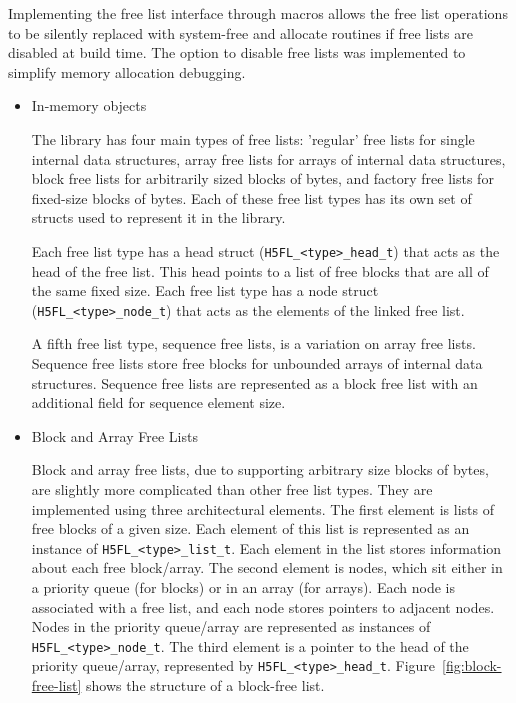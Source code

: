 Implementing the free list interface through macros allows the free list operations to be silently replaced with system-free and allocate routines if free lists are disabled at build time. The option to disable free lists was implemented to simplify memory allocation debugging.

\begin{itemize}

\item In-memory objects

The library has four main types of free lists: 'regular' free lists for single internal data structures, array free lists for arrays of internal data structures, block free lists for arbitrarily sized blocks of bytes, and factory free lists for fixed-size blocks of bytes. Each of these free list types has its own set of structs used to represent it in the library. 

Each free list type has a head struct (\texttt{H5FL\_<type>\_head\_t}) that acts as the head of the free list. This head points to a list of free blocks that are all of the same fixed size. Each free list type has a node struct (\texttt{H5FL\_<type>\_node\_t}) that acts as the elements of the linked free list. 


A fifth free list type, sequence free lists, is a variation on array free lists. Sequence free lists store free blocks for unbounded arrays of internal data structures. Sequence free lists are represented as a block free list with an additional field for sequence element size.

\item Block and Array Free Lists

Block and array free lists, due to supporting arbitrary size blocks of bytes, are slightly more complicated than other free list types. They are implemented using three architectural elements. The first element is lists of free blocks of a given size. Each element of this list is represented as an instance of \texttt{H5FL\_<type>\_list\_t}. Each element in the list stores information about each free block/array. The second element is nodes, which sit either in a priority queue (for blocks) or in an array (for arrays). Each node is associated with a free list, and each node stores pointers to adjacent nodes. Nodes in the priority queue/array are represented as instances of \texttt{H5FL\_<type>\_node\_t}. The third element is a pointer to the head of the priority queue/array, represented by \texttt{H5FL\_<type>\_head\_t}. Figure~\ref{fig:block-free-list} shows the structure of a block-free list.


\end{itemize}
